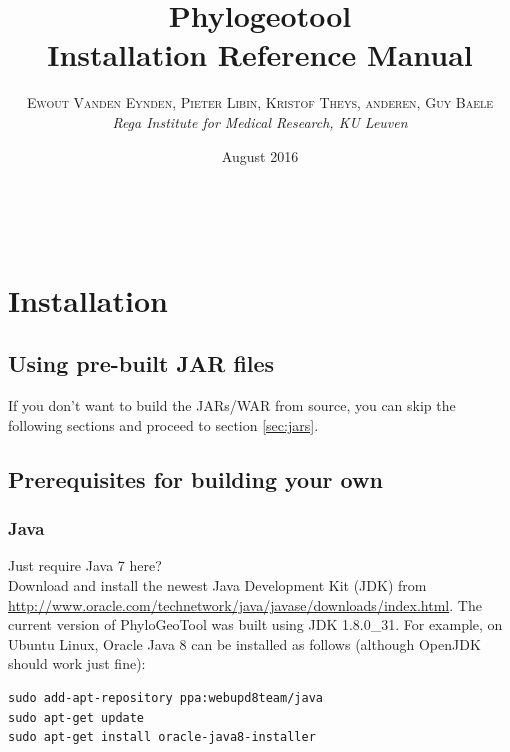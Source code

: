 \documentclass[a4paper, 11pt]{article} %
\title{\textbf{Phylogeotool}\\ %
Installation Reference Manual} %
\author{\textsc{Ewout Vanden Eynden, Pieter Libin, Kristof Theys, anderen, Guy Baele} %
\\{\textit{Rega Institute for Medical Research, KU Leuven}}} %
\date{August 2016} %
\makeatletter
\renewcommand{\maketitle}{ %
\begin{flushright} %
{\LARGE\@title} %

\vspace{50pt} %

{\large\@author} %
\\\@date %

\vspace{40pt} %
\end{flushright}
}
\makeatother
\begin{document}
\maketitle %

\vspace{30pt} %

\tableofcontents
\newpage

\section{Installation}

\subsection{Using pre-built JAR files}
If you don't want to build the JARs/WAR from source, you can skip the following sections and proceed to section \ref{sec:jars}.

\subsection{Prerequisites for building your own}

\subsubsection*{Java}
Just require Java 7 here?\\

Download and install the newest Java Development Kit (JDK) from \url{http://www.oracle.com/technetwork/java/javase/downloads/index.html}.
The current version of PhyloGeoTool was built using JDK 1.8.0\_31.
For example, on Ubuntu Linux, Oracle Java 8 can be installed as follows (although OpenJDK should work just fine):
\begin{verbatim} 
sudo add-apt-repository ppa:webupd8team/java
sudo apt-get update
sudo apt-get install oracle-java8-installer
\end{verbatim}
\end{document}
